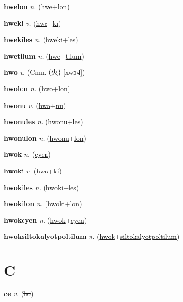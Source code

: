 \textbf{\hypertarget{hwelon}{hwelon}} \textit{n.} (\hyperlink{hwe}{hwe}+\allowbreak \hyperlink{lon}{lon})


\textbf{\hypertarget{hweki}{hweki}} \textit{v.} (\hyperlink{hwe}{hwe}+\allowbreak \hyperlink{ki}{ki})


\textbf{\hypertarget{hwekiles}{hwekiles}} \textit{n.} (\hyperlink{hweki}{hweki}+\allowbreak \hyperlink{les}{les})


\textbf{\hypertarget{hwetilum}{hwetilum}} \textit{n.} (\hyperlink{hwe}{hwe}+\allowbreak \hyperlink{tilum}{tilum})


\textbf{\hypertarget{hwo}{hwo}} \textit{v.} (Cmn. ⟨{\chinese{}火}⟩ [xwɔ˧˩˧])


\textbf{\hypertarget{hwolon}{hwolon}} \textit{n.} (\hyperlink{hwo}{hwo}+\allowbreak \hyperlink{lon}{lon})


\textbf{\hypertarget{hwonu}{hwonu}} \textit{v.} (\hyperlink{hwo}{hwo}+\allowbreak \hyperlink{nu}{nu})


\textbf{\hypertarget{hwonules}{hwonules}} \textit{n.} (\hyperlink{hwonu}{hwonu}+\allowbreak \hyperlink{les}{les})


\textbf{\hypertarget{hwonulon}{hwonulon}} \textit{n.} (\hyperlink{hwonu}{hwonu}+\allowbreak \hyperlink{lon}{lon})


\textbf{\hypertarget{hwok}{hwok}} \textit{n.} (\hyperlink{cyen}{\sout{cyen}})


\textbf{\hypertarget{hwoki}{hwoki}} \textit{v.} (\hyperlink{hwo}{hwo}+\allowbreak \hyperlink{ki}{ki})


\textbf{\hypertarget{hwokiles}{hwokiles}} \textit{n.} (\hyperlink{hwoki}{hwoki}+\allowbreak \hyperlink{les}{les})


\textbf{\hypertarget{hwokilon}{hwokilon}} \textit{n.} (\hyperlink{hwoki}{hwoki}+\allowbreak \hyperlink{lon}{lon})


\textbf{\hypertarget{hwokcyen}{hwokcyen}} \textit{n.} (\hyperlink{hwok}{hwok}+\allowbreak \hyperlink{cyen}{cyen})


\textbf{\hypertarget{hwoksiltokalyotpoltilum}{hwoksiltokalyotpoltilum}} \textit{n.} (\hyperlink{hwok}{hwok}+\allowbreak \hyperlink{siltokalyotpoltilum}{siltokalyotpoltilum})


\section{C}

\textbf{\hypertarget{ce}{ce}} \textit{v.} (\hyperlink{ho}{\sout{ho}})


